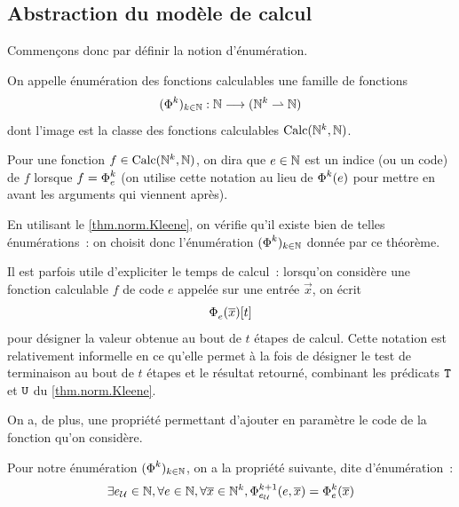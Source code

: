 \subsection{Abstraction du modèle de calcul}

Commençons donc par définir la notion d'énumération.

\begin{definition}
  On appelle énumération des fonctions calculables une famille de fonctions
  \[(\operatorname{\Phi}_{}^{k})_{k \in \mathbb N} : \displaystyle \mathbb N \longrightarrow (\mathbb N^k \rightharpoonup \mathbb N)\]
  dont l'image est la classe des fonctions calculables $\operatorname{Calc}(\mathbb N^k,\mathbb N)$.

  Pour une fonction $f \in \operatorname{Calc}(\mathbb N^k,\mathbb N)$, on dira que $e \in \mathbb N$ est un
  indice (ou un code) de $f$ lorsque $f = \operatorname{\Phi}_{e}^{k}$ (on utilise cette notation
  au lieu de $\operatorname{\Phi}_{}^{k}(e)$ pour mettre en avant les arguments qui viennent
  après).
\end{definition}

\begin{remark}
  En utilisant le \cref{thm.norm.Kleene}, on vérifie qu'il existe bien de telles
  énumérations~: on choisit donc l'énumération $(\operatorname{\Phi}_{}^{k})_{k \in \mathbb N}$ donnée
  par ce théorème.
\end{remark}

\begin{notation}
  Il est parfois utile d'expliciter le temps de calcul~: lorsqu'on considère une
  fonction calculable $f$ de code $e$ appelée sur une entrée $\vec x$, on écrit
  \[\operatorname{\Phi}_{e}^{}(\overline{x})[t]\]
  pour désigner la valeur obtenue au bout de $t$ étapes de calcul. Cette
  notation est relativement informelle en ce qu'elle permet à la fois de
  désigner le test de terminaison au bout de $t$ étapes et le résultat
  retourné, combinant les prédicats ${\normalfont\texttt{T}}$ et ${\normalfont\texttt{U}}$ du \cref{thm.norm.Kleene}.
\end{notation}

On a, de plus, une propriété permettant d'ajouter en paramètre le code de la
fonction qu'on considère.

\begin{property}[\'Enumération]
  Pour notre énumération $(\operatorname{\Phi}_{}^{k})_{k \in \mathbb N}$, on a la propriété suivante,
  dite d'énumération~:
  \[\exists e_{\mathcal{U}} \in \mathbb N, \forall e \in \mathbb N,
  \forall \overline{x} \in \mathbb N^k,
  \operatorname{\Phi}_{e_{\mathcal{U}}}^{k+1}(e,\overline{x}) = \operatorname{\Phi}_{e}^{k}(\overline{x})\]
\end{property}

